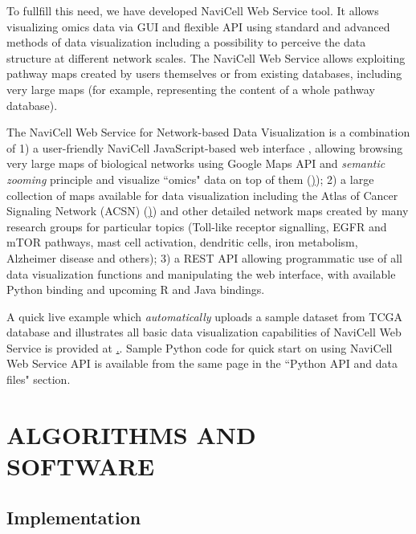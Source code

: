 \documentclass[a4,center,fleqn]{NAR}
\begin{document}
To fullfill this need, we have developed NaviCell Web Service tool. It allows
visualizing omics data via GUI and flexible API using standard and advanced
methods of data visualization including a possibility to perceive the data
structure at different network scales. The NaviCell Web Service allows
exploiting pathway maps created by users themselves or from existing databases,
including very large maps (for example, representing the content of a whole
pathway database).


\enlargethispage{-65.1pt}





The NaviCell Web Service for Network-based Data
Visualization is a combination of 1) a user-friendly NaviCell JavaScript-based
web interface \cite{kuperstein2013navicell}, allowing browsing very large maps
of biological networks using Google Maps API and \emph{semantic zooming}
principle and visualize ``omics" data on top of them
(\href{https://navicell.curie.fr})); 2) a large collection of maps available for
data visualization including the Atlas of Cancer Signaling Network (ACSN)
(\href{https://acsn.curie.fr}))  and other detailed network maps created by many
research groups for particular topics (Toll-like receptor signalling, EGFR
and mTOR pathways, mast cell activation, dendritic cells, iron metabolism,
Alzheimer disease and others); 3) a REST API allowing programmatic use of all
data visualization functions and manipulating the web interface, with available
Python binding and upcoming R and Java bindings.

A quick live example which \emph{automatically} uploads a sample dataset from
TCGA database and illustrates all basic data visualization capabilities of
NaviCell Web Service is provided at
\href{http://navicell.curie.fr/pages/nav\_web\_service.html}.. Sample Python
code for quick start on using NaviCell Web Service API is available from the
same page in the ``Python API and data files" section.

\section{ALGORITHMS AND SOFTWARE}

\subsection{Implementation}
\end{document}
